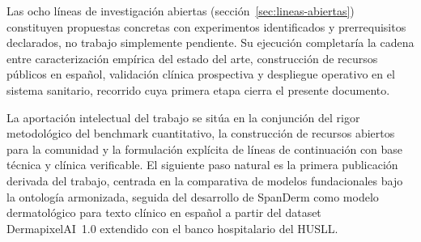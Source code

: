 Las ocho líneas de investigación abiertas
(secci\'on~\ref{sec:lineas-abiertas}) constituyen propuestas concretas con
experimentos identificados y prerrequisitos declarados, no trabajo
simplemente pendiente. Su ejecución completaría la cadena entre
caracterización empírica del estado del arte, construcción de
recursos públicos en español, validación clínica prospectiva y
despliegue operativo en el sistema sanitario, recorrido cuya
primera etapa cierra el presente documento.

La aportación intelectual del trabajo se sitúa en la conjunción
del rigor metodológico del benchmark cuantitativo, la construcción
de recursos abiertos para la comunidad y la formulación explícita
de líneas de continuación con base técnica y clínica
verificable. El siguiente paso natural es la primera publicación
derivada del trabajo, centrada en la comparativa de modelos
fundacionales bajo la ontología armonizada, seguida del
desarrollo de SpanDerm como modelo dermatológico para texto
clínico en español a partir del dataset DermapixelAI~1.0
extendido con el banco hospitalario del HUSLL.
